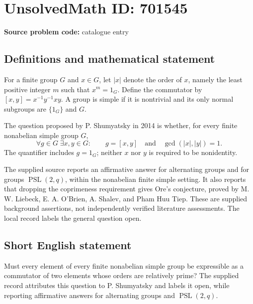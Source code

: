 \documentclass[11pt]{article}
\begin{document}
\section*{UnsolvedMath ID: 701545}
\textbf{Source problem code:} catalogue entry
\subsection{Definitions and mathematical statement}
For a finite group \(G\) and \(x\in G\), let \(|x|\) denote the order of \(x\), namely the least positive integer \(m\) such that \(x^m=1_G\). Define the commutator by \([x,y]=x^{-1}y^{-1}xy\). A group is simple if it is nontrivial and its only normal subgroups are \(\{1_G\}\) and \(G\).

The question proposed by P. Shumyatsky in 2014 is whether, for every finite nonabelian simple group \(G\),
\[
\forall g\in G\;\exists x,y\in G:\qquad g=[x,y]\quad\text{and}\quad\gcd(|x|,|y|)=1.
\]
The quantifier includes \(g=1_G\); neither \(x\) nor \(y\) is required to be nonidentity.

The supplied source reports an affirmative answer for alternating groups and for groups \(\operatorname{PSL}(2,q)\), within the nonabelian finite simple setting. It also reports that dropping the coprimeness requirement gives Ore's conjecture, proved by M. W. Liebeck, E. A. O'Brien, A. Shalev, and Pham Huu Tiep. These are supplied background assertions, not independently verified literature assessments. The local record labels the general question open.
\subsection{Short English statement}
Must every element of every finite nonabelian simple group be expressible as a commutator of two elements whose orders are relatively prime? The supplied record attributes this question to P. Shumyatsky and labels it open, while reporting affirmative answers for alternating groups and \(\operatorname{PSL}(2,q)\).
\end{document}
